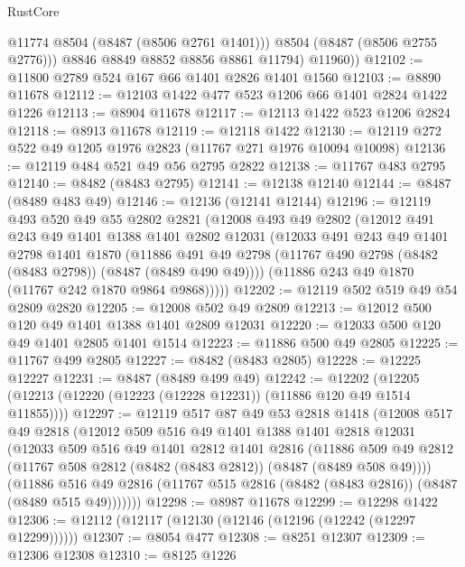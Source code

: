 \begin{lexlean}{RustCore}
\begin{coremodule}
              @11774
              @8504
              (@8487 (@8506 @2761 @1401)))
            @8504
            (@8487 (@8506 @2755 @2776)))
          @8846
          @8849
          @8852
          @8856
          @8861
          @11794)
        @11960))
@12102 := @11800 @2789 @524 @167 @66 @1401 @2826 @1401 @1560
@12103 := @8890 @11678
@12112 := @12103 @1422 @477 @523 @1206 @66 @1401 @2824 @1422 @1226
@12113 := @8904 @11678
@12117 := @12113 @1422 @523 @1206 @2824
@12118 := @8913 @11678
@12119 := @12118 @1422
@12130 := @12119 @272 @522 @49 @1205 @1976 @2823 (@11767 @271 @1976 @10094 @10098)
@12136 := @12119 @484 @521 @49 @56 @2795 @2822
@12138 := @11767 @483 @2795
@12140 := @8482 (@8483 @2795)
@12141 := @12138 @12140
@12144 := @8487 (@8489 @483 @49)
@12146 := @12136 (@12141 @12144)
@12196 := @12119
    @493
    @520
    @49
    @55
    @2802
    @2821
    (@12008
      @493
      @49
      @2802
      (@12012
        @491
        @243
        @49
        @1401
        @1388
        @1401
        @2802
        @12031
        (@12033
          @491
          @243
          @49
          @1401
          @2798
          @1401
          @1870
          (@11886 @491 @49 @2798 (@11767 @490 @2798 (@8482 (@8483 @2798)) (@8487 (@8489 @490 @49))))
          (@11886 @243 @49 @1870 (@11767 @242 @1870 @9864 @9868)))))
@12202 := @12119 @502 @519 @49 @54 @2809 @2820
@12205 := @12008 @502 @49 @2809
@12213 := @12012 @500 @120 @49 @1401 @1388 @1401 @2809 @12031
@12220 := @12033 @500 @120 @49 @1401 @2805 @1401 @1514
@12223 := @11886 @500 @49 @2805
@12225 := @11767 @499 @2805
@12227 := @8482 (@8483 @2805)
@12228 := @12225 @12227
@12231 := @8487 (@8489 @499 @49)
@12242 := @12202 (@12205 (@12213 (@12220 (@12223 (@12228 @12231)) (@11886 @120 @49 @1514 @11855))))
@12297 := @12119
    @517
    @87
    @49
    @53
    @2818
    @1418
    (@12008
      @517
      @49
      @2818
      (@12012
        @509
        @516
        @49
        @1401
        @1388
        @1401
        @2818
        @12031
        (@12033
          @509
          @516
          @49
          @1401
          @2812
          @1401
          @2816
          (@11886 @509 @49 @2812 (@11767 @508 @2812 (@8482 (@8483 @2812)) (@8487 (@8489 @508 @49))))
          (@11886
            @516
            @49
            @2816
            (@11767 @515 @2816 (@8482 (@8483 @2816)) (@8487 (@8489 @515 @49)))))))
@12298 := @8987 @11678
@12299 := @12298 @1422
@12306 := @12112 (@12117 (@12130 (@12146 (@12196 (@12242 (@12297 @12299))))))
@12307 := @8054 @477
@12308 := @8251 @12307
@12309 := @12306 @12308
@12310 := @8125 @1226

\end{coremodule}
\end{lexlean}
